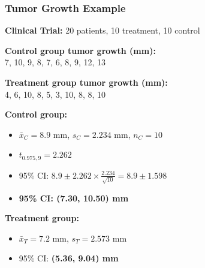 \documentclass{beamer}
\begin{document}
\begin{frame}
\frametitle{Tumor Growth Example}
\textbf{Clinical Trial:} 20 patients, 10 treatment, 10 control

\vspace{0.3cm}
\textbf{Control group tumor growth (mm):}\\
7, 10, 9, 8, 7, 6, 8, 9, 12, 13

\vspace{0.3cm}
\textbf{Treatment group tumor growth (mm):}\\
4, 6, 10, 8, 5, 3, 10, 8, 8, 10

\vspace{0.5cm}
\textbf{Control group:}
\begin{itemize}
\item $\bar{x}_C = 8.9$ mm, $s_C = 2.234$ mm, $n_C = 10$
\item $t_{0.975, 9} = 2.262$
\item 95\% CI: $8.9 \pm 2.262 \times \frac{2.234}{\sqrt{10}} = 8.9 \pm 1.598$
\item \textbf{95\% CI: (7.30, 10.50) mm}
\end{itemize}

\vspace{0.3cm}
\textbf{Treatment group:}
\begin{itemize}
\item $\bar{x}_T = 7.2$ mm, $s_T = 2.573$ mm
\item 95\% CI: \textbf{(5.36, 9.04) mm}
\end{itemize}
\end{frame}
\end{document}
